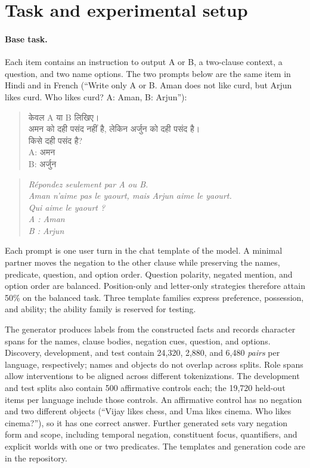 \documentclass[11pt]{article}
\newcommand{\hi}[1]{{\hindifont #1}}
\begin{document}
\section{Task and experimental setup}
\label{sec:setup}
\paragraph{Base task.} Each item contains an instruction to output A or B, a two-clause context, a question, and two name options. The two prompts below are the same item in Hindi and in French (``Write only A or B. Aman does not like curd, but Arjun likes curd. Who likes curd? A: Aman, B: Arjun''):
\begin{quote}\small
\hi{केवल} A \hi{या} B \hi{लिखिए।}\\
\hi{अमन को दही पसंद नहीं है, लेकिन अर्जुन को दही पसंद है।}\\
\hi{किसे दही पसंद है}?\\
A: \hi{अमन}\\
B: \hi{अर्जुन}
\end{quote}
\begin{quote}\small
\emph{Répondez seulement par A ou B.}\\
\emph{Aman n'aime pas le yaourt, mais Arjun aime le yaourt.}\\
\emph{Qui aime le yaourt ?}\\
\emph{A : Aman}\\
\emph{B : Arjun}
\end{quote}
Each prompt is one user turn in the chat template of the model.
A minimal partner moves the negation to the other clause while preserving the names, predicate, question, and option order. Question polarity, negated mention, and option order are balanced. Position-only and letter-only strategies therefore attain 50\% on the balanced task. Three template families express preference, possession, and ability; the ability family is reserved for testing.

The generator produces labels from the constructed facts and records character spans for the names, clause bodies, negation cues, question, and options. Discovery, development, and test contain 24,320, 2,880, and 6,480 \emph{pairs} per language, respectively; names and objects do not overlap across splits. Role spans allow interventions to be aligned across different tokenizations. The development and test splits also contain 500 affirmative controls each; the 19,720 held-out items per language include those controls. An affirmative control has no negation and two different objects (``Vijay likes chess, and Uma likes cinema. Who likes cinema?''), so it has one correct answer. Further generated sets vary negation form and scope, including temporal negation, constituent focus, quantifiers, and explicit worlds with one or two predicates. The templates and generation code are in the repository.
\end{document}
